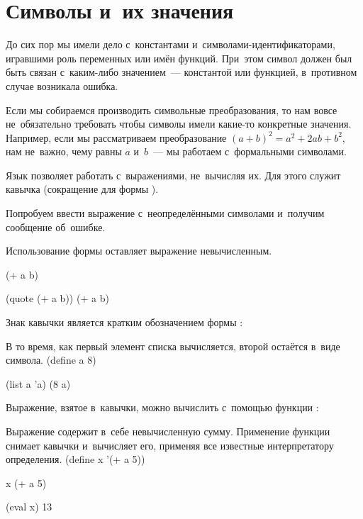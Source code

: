\label{Less:symbols}

\section{Символы и~их значения}%
До сих пор мы имели дело с~константами и~символами-идентификаторами, игравшими роль переменных или имён функций. При~этом символ должен был быть связан с~каким-либо значением~--- константой или функцией, в~противном случае возникала ошибка.

Если мы собираемся производить символьные преобразования, то нам вовсе не~обязательно требовать чтобы символы имели какие-то конкретные значения. Например, если мы рассматриваем преобразование $(a + b)^2 = a^2 + 2ab + b^2$, нам не~важно, чему равны $a$ и~$b$~--- мы работаем с~формальными символами.

Язык \Scheme позволяет работать с~выражениями, не~вычисляя их. Для этого служит кавычка  (сокращение для формы ).

\begin{example}{Попробуем ввести выражение с~неопределёнными символами и~получим сообщение об~ошибке.

Использование формы  оставляет выражение невычисленным.}
\REPLin
  {(+ a b)}


\REPL
  {(quote (+ a b))}
  {(+ a b)}
\end{example}

\begin{example}{%
Знак кавычки  является кратким обозначением формы :}
\end{example}

\begin{example}{В то время, как первый элемент списка  вычисляется, второй остаётся в~виде символа.}
\REPLin
  {(define a 8)}

\REPL
  {(list a 'a)}
  {(8 a)}
\end{example}

Выражение, взятое в~кавычки, можно вычислить с~помощью функции :

\begin{example}{Выражение  содержит в~себе невычисленную сумму. Применение функции  снимает кавычки и~вычисляет его, применяя все известные интерпретатору определения.}
\REPLin
  {(define x '(+ a 5))}

\REPL
  {x}
  {(+ a 5)}

\REPL
  {(eval x)}
  {13}
\end{example}

